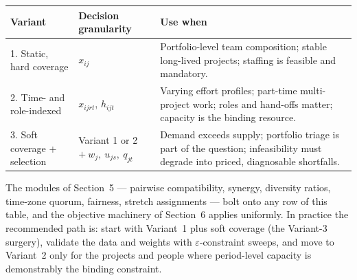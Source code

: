 \documentclass[11pt]{article}
\theoremstyle{remark}
\begin{document}
\begin{center}
\begin{tabular}{p{3.4cm} p{4.6cm} p{6.2cm}}
\toprule
Variant & Decision granularity & Use when \\
\midrule
1. Static, hard coverage &
$x_{ij}$ &
Portfolio-level team composition; stable long-lived projects; staffing is
feasible and mandatory. \\[6pt]
2. Time- and role-indexed &
$x_{ijrt}$, $h_{ijt}$ &
Varying effort profiles; part-time multi-project work; roles and hand-offs
matter; capacity is the binding resource. \\[6pt]
3. Soft coverage + selection &
Variant 1 or 2 $+\ w_j,\ u_{js},\ q_{jt}$ &
Demand exceeds supply; portfolio triage is part of the question;
infeasibility must degrade into priced, diagnosable shortfalls. \\
\bottomrule
\end{tabular}
\end{center}

The modules of Section~5 --- pairwise compatibility, synergy, diversity
ratios, time-zone quorum, fairness, stretch assignments --- bolt onto any
row of this table, and the objective machinery of Section~6 applies
uniformly. In practice the recommended path is: start with Variant~1 plus
soft coverage (the Variant-3 surgery), validate the data and weights with
$\varepsilon$-constraint sweeps, and move to Variant~2 only for the
projects and people where period-level capacity is demonstrably the
binding constraint.
\end{document}
